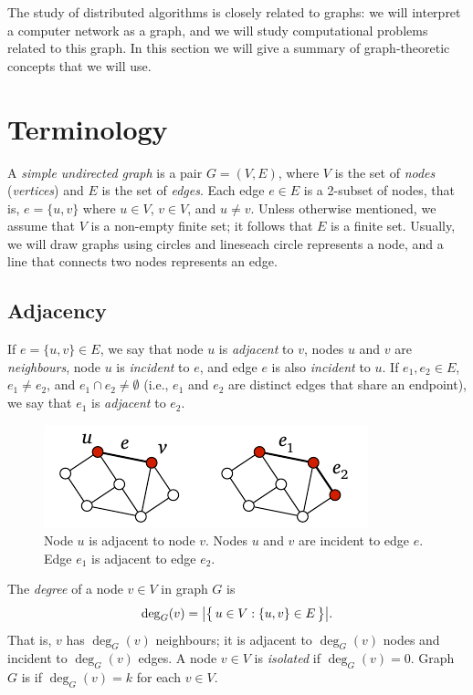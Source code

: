 
The study of distributed algorithms is closely related to graphs: we will interpret a computer network as a graph, and we will study computational problems related to this graph. In this section we will give a summary of graph-theoretic concepts that we will use.

\section{Terminology}

A \emph{simple undirected graph} is a pair $G = (V,E)$, where $V$ is the set of \emph{nodes} (\emph{vertices}) and $E$ is the set of \emph{edges}. Each edge $e \in E$ is a 2-subset of nodes, that is, $e = \{u,v\}$ where $u \in V$, $v \in V$, and $u \ne v$. Unless otherwise mentioned, we assume that $V$ is a non-empty finite set; it follows that $E$ is a finite set. Usually, we will draw graphs using circles and lines\mydash each circle represents a node, and a line that connects two nodes represents an edge.


\subsection{Adjacency}

If $e = \{u,v\} \in E$, we say that node $u$ is \emph{adjacent} to $v$, nodes $u$ and $v$ are \emph{neighbours}, node $u$ is \emph{incident} to $e$, and edge $e$ is also \emph{incident} to $u$. If $e_1, e_2 \in E$, $e_1 \ne e_2$, and $e_1 \cap e_2 \ne \emptyset$ (i.e., $e_1$ and $e_2$ are distinct edges that share an endpoint), we say that $e_1$ is \emph{adjacent} to $e_2$.
\begin{figure}
    \centering
    \includegraphics[page=\PGraph]{figs.pdf}
    \caption{Node $u$ is adjacent to node $v$. Nodes $u$ and $v$ are incident to edge $e$. Edge $e_1$ is adjacent to edge $e_2$.}\label{fig:graph}
\end{figure}

The \emph{degree} of a node $v \in V$ in graph $G$ is \[
    \deg_G(v) = \bigl|\bigl\{\,  u \in V : \{u,v\} \in E  \,\bigr\}\bigr|.
\]
That is, $v$ has $\deg_G(v)$ neighbours; it is adjacent to $\deg_G(v)$ nodes and incident to $\deg_G(v)$ edges. A node $v \in V$ is \emph{isolated} if $\deg_G(v) = 0$. Graph $G$ is \emph{} if $\deg_G(v) = k$ for each $v \in V$.


